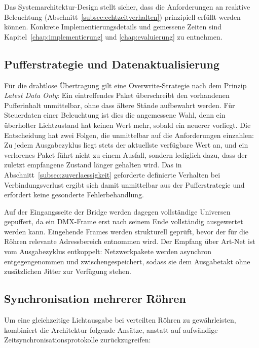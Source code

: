 Das Systemarchitektur-Design stellt sicher, dass die Anforderungen an reaktive Beleuchtung 
(Abschnitt~\ref{subsec:echtzeitverhalten}) prinzipiell erfüllt werden können. 
Konkrete Implementierungsdetails und gemessene Zeiten sind Kapitel~\ref{chap:implementierung} 
und \ref{chap:evaluierung} zu entnehmen.

\subsection{Pufferstrategie und Datenaktualisierung}
\label{subsec:pufferstrategie}

Für die drahtlose Übertragung gilt eine Overwrite-Strategie nach dem Prinzip
\textit{Latest Data Only}: Ein eintreffendes Paket überschreibt den vorhandenen
Pufferinhalt unmittelbar, ohne dass ältere Stände aufbewahrt werden. Für Steuerdaten
einer Beleuchtung ist dies die angemessene Wahl, denn ein überholter Lichtzustand hat
keinen Wert mehr, sobald ein neuerer vorliegt. Die Entscheidung hat zwei Folgen, die
unmittelbar auf die Anforderungen einzahlen: Zu jedem Ausgabezyklus liegt stets der
aktuellste verfügbare Wert an, und ein verlorenes Paket führt nicht zu einem Ausfall,
sondern lediglich dazu, dass der zuletzt empfangene Zustand länger gehalten wird. Das in
Abschnitt~\ref{subsec:zuverlaessigkeit} geforderte definierte Verhalten bei
Verbindungsverlust ergibt sich damit unmittelbar aus der Pufferstrategie und erfordert
keine gesonderte Fehlerbehandlung.

Auf der Eingangsseite der Bridge werden dagegen vollständige Universen gepuffert, da ein
DMX-Frame erst nach seinem Ende vollständig ausgewertet werden kann. Eingehende Frames
werden strukturell geprüft, bevor der für die Röhren relevante Adressbereich entnommen
wird. Der Empfang über Art-Net ist vom Ausgabezyklus entkoppelt: Netzwerkpakete werden
asynchron entgegengenommen und zwischengespeichert, sodass sie dem Ausgabetakt ohne
zusätzlichen Jitter zur Verfügung stehen.

\subsection{Synchronisation mehrerer Röhren}
\label{subsec:synchronisation-roehem}

Um eine gleichzeitige Lichtausgabe bei verteilten Röhren zu gewährleisten, kombiniert 
die Architektur folgende Ansätze, anstatt auf aufwändige Zeitsynchronisationsprotokolle zurückzugreifen:

